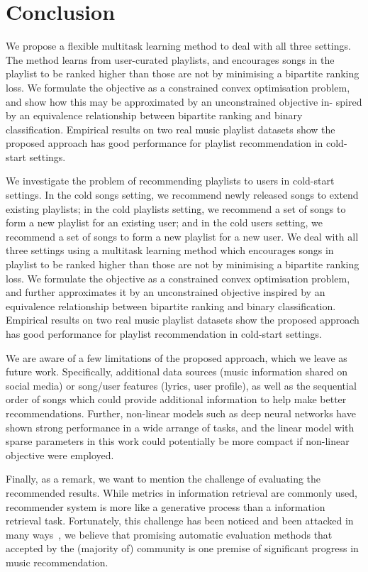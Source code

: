 \section{Conclusion}


We propose a flexible multitask learning method to deal with all
three settings. The method learns from user-curated playlists, and
encourages songs in the playlist to be ranked higher than those
are not by minimising a bipartite ranking loss. We formulate the
objective as a constrained convex optimisation problem, and show
how this may be approximated by an unconstrained objective in-
spired by an equivalence relationship between bipartite ranking and
binary classification. Empirical results on two real music playlist
datasets show the proposed approach has good performance for
playlist recommendation in cold-start settings.


We investigate the problem of recommending playlists to users in cold-start settings.
In the cold songs setting, we recommend newly released songs to extend existing playlists;
in the cold playlists setting, we recommend a set of songs to form a new playlist for an existing user;
and in the cold users setting, we recommend a set of songs to form a new playlist for a new user.
We deal with all three settings using a multitask learning method which encourages songs in playlist 
to be ranked higher than those are not by minimising a bipartite ranking loss. 
We formulate the objective as a constrained convex optimisation problem, and further approximates it 
by an unconstrained objective inspired by an equivalence relationship between bipartite ranking and
binary classification. 
Empirical results on two real music playlist datasets show the proposed approach 
has good performance for playlist recommendation in cold-start settings.

We are aware of a few limitations of the proposed approach, which we leave as future work.
Specifically, additional data sources (\eg music information shared on social media) or song/user 
features (\eg lyrics, user profile), as well as the sequential order of songs which could provide 
additional information to help make better recommendations.
Further, non-linear models such as deep neural networks have shown strong performance in a wide arrange of tasks,
and the linear model with sparse parameters in this work could potentially be more compact if non-linear objective were employed.

Finally, as a remark, we want to mention the challenge of evaluating the recommended results.
While metrics in information retrieval are commonly used, recommender system is more like a generative process
than a information retrieval task. Fortunately, this challenge has been noticed and been attacked in many 
ways~\cite{mcfee2011natural,mcfee2012hypergraph,schedl2017}, 
we believe that promising automatic evaluation methods that accepted by the (majority of) 
community is one premise of significant progress in music recommendation.
